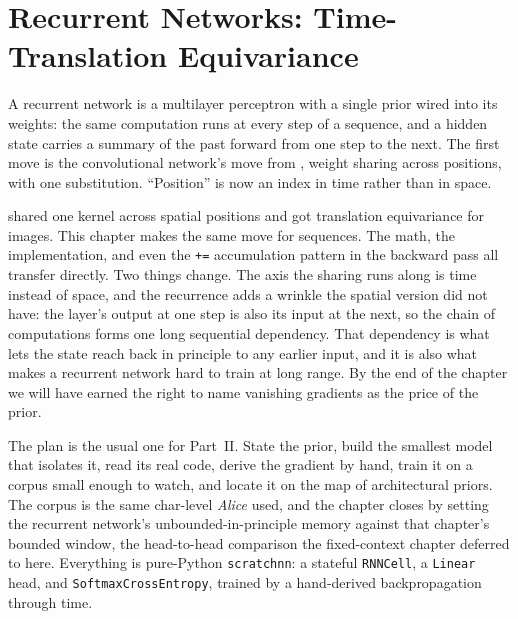 
\chapter[Recurrent Networks]{Recurrent Networks: Time-Translation
  Equivariance}%
\label{ch:rnn}

A recurrent network is a multilayer perceptron with a single prior wired
into its weights: the same computation runs at every step of a sequence,
and a hidden state carries a summary of the past forward from one step to
the next. The first move is the convolutional network's move from
, weight sharing across positions, with one substitution.
``Position'' is now an index in time rather than in space.

 shared one kernel across spatial positions and got
translation equivariance for images. This chapter makes the same move for
sequences. The math, the implementation, and even the \texttt{+=}
accumulation pattern in the backward pass all transfer directly. Two things
change. The axis the sharing runs along is time instead of space, and the
recurrence adds a wrinkle the spatial version did not have: the layer's
output at one step is also its input at the next, so the chain of
computations forms one long sequential dependency. That dependency is what
lets the state reach back in principle to any earlier input, and it is also
what makes a recurrent network hard to train at long range. By the end of
the chapter we will have earned the right to name vanishing gradients as the
price of the prior.

The plan is the usual one for Part~II. State the prior, build the smallest
model that isolates it, read its real code, derive the gradient by hand,
train it on a corpus small enough to watch, and locate it on the map of
architectural priors. The corpus is the same char-level \emph{Alice}
 used, and the chapter closes by setting the
recurrent network's unbounded-in-principle memory against that chapter's
bounded window, the head-to-head comparison the fixed-context chapter
deferred to here. Everything is pure-Python \texttt{scratchnn}: a stateful
\texttt{RNNCell}, a \texttt{Linear} head, and \texttt{SoftmaxCrossEntropy},
trained by a hand-derived backpropagation through time.






